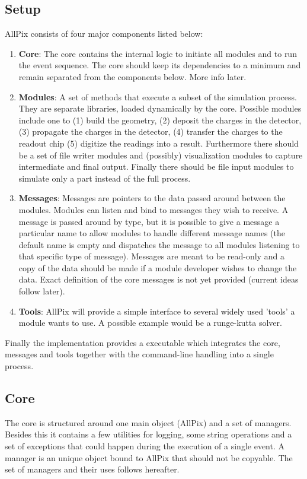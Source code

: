 \subsection{Setup}
AllPix consists of four major components listed below:
\begin{enumerate}
\item \textbf{Core}: The core contains the internal logic to initiate all modules and to run the event sequence. The core should keep its dependencies to a minimum and remain separated from the components below. More info later.
\item \textbf{Modules}: A set of methods that execute a subset of the simulation process. They are separate libraries, loaded dynamically by the core. Possible modules include one to (1) build the geometry, (2) deposit the charges in the detector, (3) propagate the charges in the detector, (4) transfer the charges to the readout chip (5) digitize the readings into a result. Furthermore there should be a set of file writer modules and (possibly) visualization modules to capture intermediate and final output. Finally there should be file input modules to simulate only a part instead of the full process.
\item \textbf{Messages}: Messages are pointers to the data passed around between the modules. Modules can listen and bind to messages they wish to receive. A message is passed around by type, but it is possible to give a message a particular name to allow modules to handle different message names (the default name is empty and dispatches the message to all modules listening to that specific type of message). Messages are meant to be read-only and a copy of the data should be made if a module developer wishes to change the data. Exact definition of the core messages is not yet provided (current ideas follow later).
\item \textbf{Tools}: AllPix will provide a simple interface to several widely used 'tools' a module wants to use. A possible example would be a runge-kutta solver.
\end{enumerate}

Finally the implementation provides a executable which integrates the core, messages and tools together with the command-line handling into a single process.

\subsection{Core}
The core is structured around one main object (AllPix) and a set of managers. Besides this it contains a few utilities for logging, some string operations and a set of exceptions that could happen during the execution of a single event. A manager is an unique object bound to AllPix that should not be copyable. The set of managers and their uses follows hereafter.

